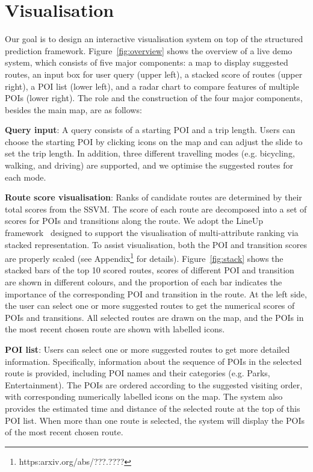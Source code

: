 \section{Visualisation}
Our goal is to design an interactive visualisation system on top of the structured prediction framework.
Figure~\ref{fig:overview} shows the overview of a live demo system, which consists of five major components: a map to display suggested routes, an input box for user query (upper left), a stacked score of routes (upper right), a POI list (lower left), and a radar chart to compare features of multiple POIs (lower right). 
The role and the construction of the four major components, besides the main map, are as follows:

\textbf{Query input}: A query consists of a starting POI and a trip length. 
Users can choose the starting POI by clicking icons on the map and can adjust the slide to set the trip length. 
In addition, three different travelling modes (e.g. bicycling, walking, and driving) are supported, 
and we optimise the suggested routes for each mode.

\textbf{Route score visualisation}: Ranks of candidate routes are determined by their total scores from the SSVM. 
The score of each route are decomposed into a set of scores for POIs and transitions along the route. 
We adopt the LineUp framework~\cite{gratzl2013lineup} designed to support the visualisation of multi-attribute ranking via stacked representation. 
To assist visualisation, both the POI and transition scores are properly scaled (see Appendix\footnote{https:arxiv.org/abs/???.????} for details).
Figure~\ref{fig:stack} shows the stacked bars of the top 10 scored routes, 
scores of different POI and transition are shown in different colours,
and the proportion of each bar indicates the importance of the corresponding POI and transition in the route.
At the left side, %
the user can select one or more suggested routes to get the numerical scores of POIs and transitions.
All selected routes are drawn on the map, and the POIs in the most recent chosen route are shown with labelled icons.

\textbf{POI list}:
Users can select one or more suggested routes to get more detailed information. 
Specifically, information about the sequence of POIs in the selected route is provided, including POI names and their categories (e.g. Parks, Entertainment).
The POIs are ordered according to the suggested visiting order, with corresponding numerically labelled icons on the map.
The system also provides the estimated time and distance of the selected route at the top of this POI list.
When more than one route is selected, the system will display the POIs of the most recent chosen route.

